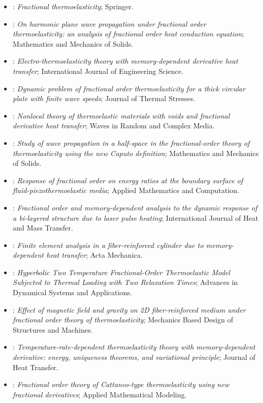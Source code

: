 \begin{itemize}
\item \citet{Povstenko2016}: \emph{Fractional thermoelasticity}; Springer.
\item \citet{Tiwari2015}: \emph{On harmonic plane wave propagation under fractional order thermoelasticity: an analysis of fractional order heat conduction equation}; Mathematics and Mechanics of Solids.
\item \citet{Ezzat2016a}: \emph{Electro-thermoelasticity theory with memory-dependent derivative heat transfer}; International Journal of Engineering Science.
\item \citet{Tripathi2016}: \emph{Dynamic problem of fractional order thermoelasticity for a thick circular plate with finite wave speeds}; Journal of Thermal Stresses.
\item \citet{Bachher2019}: \emph{Nonlocal theory of thermoelastic materials with voids and fractional derivative heat transfer}; Waves in Random and Complex Media.
\item \citet{Sherief2018}: \emph{Study of wave propagation in a half-space in the fractional-order theory of thermoelasticity using the new Caputo definition}; Mathematics and Mechanics of Solids.
\item \citet{Kumar2019}: \emph{Response of fractional order on energy ratios at the boundary surface of fluid-piezothermoelastic media}; Applied Mathematics and Computation.
\item \citet{Li2019}: \emph{Fractional order and memory-dependent analysis to the dynamic response of a bi-layered structure due to laser pulse heating}; International Journal of Heat and Mass Transfer.
\item \citet{Sur2019}: \emph{Finite element analysis in a fiber-reinforced cylinder due to memory-dependent heat transfer}; Acta Mechanica.
\item \citet{Bassiouny2020}: \emph{Hyperbolic Two Temperature Fractional-Order Thermoelastic Model Subjected to Thermal Loading with Two Relaxation Times}; Advances in Dynamical Systems and Applications.
\item \citet{Ma2020}: \emph{Effect of magnetic field and gravity on 2D fiber-reinforced medium under fractional order theory of thermoelasticity}; Mechanics Based Design of Structures and Machines.
\item \citet{Singh2020d}: \emph{Temperature-rate-dependent thermoelasticity theory with memory-dependent derivative: energy, uniqueness theorems, and variational principle}; Journal of Heat Transfer.
\item \citet{Yu2020}: \emph{Fractional order theory of Cattaneo-type thermoelasticity using new fractional derivatives}; Applied Mathematical Modeling.

\end{itemize}
